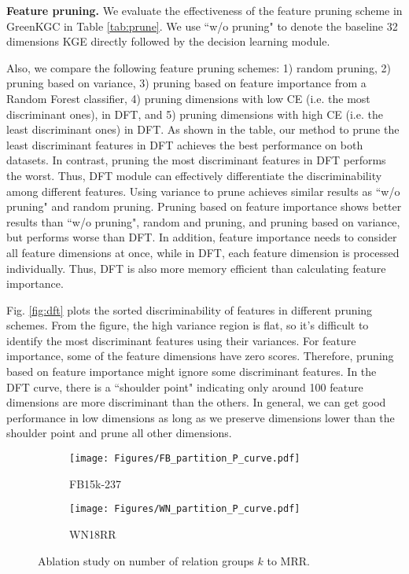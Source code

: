 \documentclass{article}
\begin{document}
\textbf{Feature pruning.} We evaluate the effectiveness
of the feature pruning scheme in GreenKGC in Table \ref{tab:prune}. We
use ``w/o pruning" to denote the baseline 32 dimensions KGE directly 
followed by the decision learning module. 
{\color{black}
Also, we compare the following feature pruning schemes: 1) random pruning, 
2) pruning based on variance, 3) pruning based on 
feature importance from a Random Forest classifier, 4) pruning dimensions 
with low CE (i.e. the most discriminant ones), in DFT, and 5) pruning 
dimensions with high CE (i.e. the least discriminant ones) in DFT.
As shown in the table, our method to prune the least discriminant features in
DFT achieves the best performance on both
datasets. In contrast, pruning the most discriminant features in DFT performs the worst. Thus, DFT module can effectively differentiate the discriminability among different features.
Using variance to prune achieves similar results as ``w/o pruning" and random pruning.
Pruning based on feature importance shows better results than ``w/o pruning", random 
and pruning, and pruning based on variance, but performs worse than DFT. In addition, feature
importance needs to consider all feature dimensions at once, while in DFT, each feature 
dimension is processed individually. Thus, DFT is also more memory efficient than calculating
feature importance.

Fig. \ref{fig:dft} plots the sorted discriminability of features in different pruning 
schemes. From the figure, the high variance region is flat, so it's difficult to identify the
most discriminant features using their variances. For feature importance, some of the feature
dimensions have zero scores. Therefore, pruning based on feature importance
might ignore some discriminant features. In the DFT curve, there is a ``shoulder point"
indicating only around 100 feature dimensions are more discriminant than the others. 
In general, we can get good performance in low dimensions as long as we preserve 
dimensions lower than the shoulder point and prune all other dimensions.
}
\begin{figure}[t]
\centering
     \begin{subfigure}[b]{0.48\textwidth}
         \centering
         \texttt{[image: Figures/FB\_partition\_P\_curve.pdf]}
         \caption{FB15k-237}
     \end{subfigure}
\begin{subfigure}[b]{0.48\textwidth}
         \centering
         \texttt{[image: Figures/WN\_partition\_P\_curve.pdf]}
         \caption{WN18RR}
     \end{subfigure}
\caption{\color{black}Ablation study on number of relation groups $k$ to MRR.}\label{fig:partition}
\end{figure}
\end{document}

